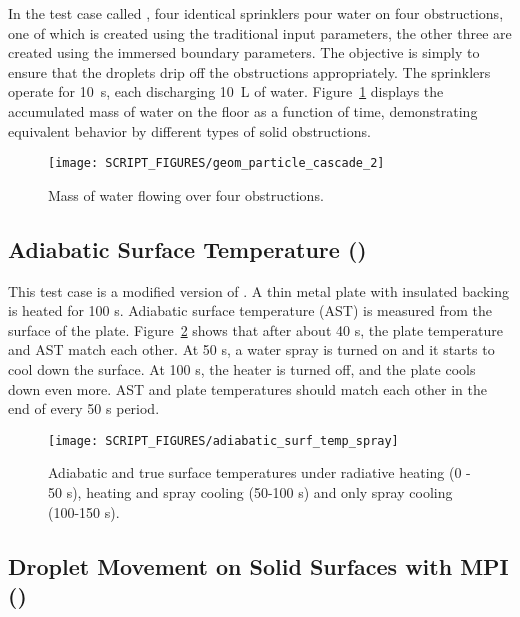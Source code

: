 \documentclass[11pt]{book}
\begin{document}
In the test case called , four identical sprinklers pour water on four obstructions, one of which is created using the traditional  input parameters, the other three are created using the immersed boundary  parameters. The objective is simply to ensure that the droplets drip off the obstructions appropriately. The sprinklers operate for 10~s, each discharging 10~L of water. Figure~\ref{geom_particle_cascade_2_fig} displays the accumulated mass of water on the floor as a function of time, demonstrating equivalent behavior by different types of solid obstructions.
\begin{figure}[h!]
\centering
\texttt{[image: SCRIPT\_FIGURES/geom\_particle\_cascade\_2]}
\caption[The  test case]{Mass of water flowing over four obstructions.}
\label{geom_particle_cascade_2_fig}
\end{figure}


\subsection{Adiabatic Surface Temperature (\texorpdfstring{{}}{adiabatic\_surf\_temp\_spray}) }
\label{AST_spray}

This test case is a modified version of . A thin metal plate with insulated backing is heated for 100 s. Adiabatic surface temperature (AST) is measured from the surface of the plate. Figure~\ref{adiabatic_surf_temp_spray} shows that after about 40 s, the plate temperature and AST match each other. At 50 s, a water spray is turned on and it starts to cool down the surface. At 100 s, the heater is turned off, and the plate cools down even more. AST and plate temperatures should match each other in the end of every 50 s period.
\begin{figure}[h!]
\centering
\texttt{[image: SCRIPT\_FIGURES/adiabatic\_surf\_temp\_spray]}
\caption[The  test case]{Adiabatic and true surface temperatures under radiative heating (0 - 50 s), heating and spray  cooling (50-100 s) and only spray cooling (100-150 s).}
\label{adiabatic_surf_temp_spray}
\end{figure}

\subsection{Droplet Movement on Solid Surfaces with MPI (\texorpdfstring{{}}{cascadempi}) }
\label{cascadempi}
\end{document}
